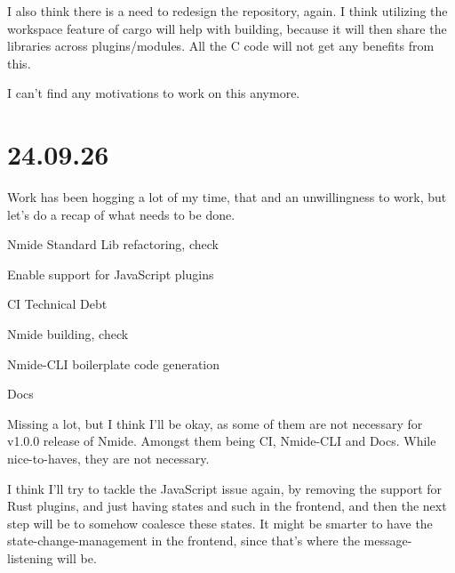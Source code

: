 I also think there is a need to redesign the repository, again. I think utilizing the workspace feature of
cargo will help with building, because it will then share the libraries across plugins/modules. All the C
code will not get any benefits from this.

I can't find any motivations to work on this anymore.


\section{24.09.26}

Work has been hogging a lot of my time, that and an unwillingness to work, but let's do a recap of what needs to be
done.

\begin{list}
  \item Nmide Standard Lib refactoring, check
  \item Enable support for JavaScript plugins
  \item CI Technical Debt
  \item Nmide building, check
  \item Nmide-CLI boilerplate code generation
  \item Docs
\end{list}

Missing a lot, but I think I'll be okay, as some of them are not necessary for v1.0.0 release of Nmide. Amongst them being CI,
Nmide-CLI and Docs. While nice-to-haves, they are not necessary.

I think I'll try to tackle the JavaScript issue again, by removing the support for Rust plugins, and just having states and such in
the frontend, and then the next step will be to somehow coalesce these states. It might be smarter to have the state-change-management in the
frontend, since that's where the message-listening will be.
